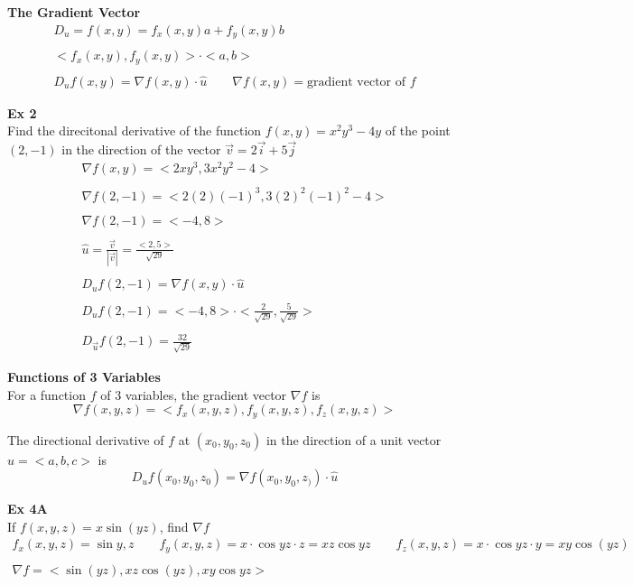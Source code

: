 \documentclass{article}
\begin{document}
    \textbf{The Gradient Vector}
    \[
        \begin{gathered}
        D_{u}=f(x,y)=f_{x}(x,y)a+f_{y}(x,y)b\\
        ~\\
        <f_{x}(x,y) ,f_{y}(x,y)> \cdot < a, b > \\
        ~\\
        D_{u}f(x,y)= \nabla f(x,y) \cdot \hat{u} \qquad \nabla f(x,y)=\text{gradient vector of }f
        \end{gathered}
    \]

    \textbf{Ex 2}\\
    Find the direcitonal derivative of the function $ f(x,y) =x^{2}y^{3}-4y  $ of the point $ (2,-1) $ in the direction of the vector $ \vec{v}=2\vec{i}+5\vec{j} $
    \[
        \begin{gathered}
        \nabla f(x,y)=< 2xy^{3}, 3x^{2}y^{2}-4>\\
        ~\\
        \nabla f(2,-1)=< 2(2)(-1)^{3} ,3(2)^{2}(-1)^{2}-4 >\\
        ~\\
        \nabla f(2,-1) = < -4, 8 >\\
        ~\\
        \hat{u}= \frac{\vec{v}}{| \vec{v} |}= \frac{< 2, 5 > }{\sqrt{29}}\\
        ~\\
        D_{u}f(2,-1)=\nabla f(x,y) \cdot \hat{u}\\
        ~\\
        D_{u}f(2,-1)= < -4, 8 > \cdot  < \frac{2}{\sqrt{29} } , \frac{5}{\sqrt{29} }  >\\
        ~\\
        \boxed{D_{\vec{u}}f(2,-1)=\frac{32}{\sqrt{29}}}     
        \end{gathered}
    \]

    \textbf{Functions of 3 Variables}\\
    For a function $ f $ of $ 3 $ variables, the gradient vector $ \nabla f $ is
    \[
        \nabla f(x,y,z)= < f_{x}(x,y,z) , f_{y}(x,y,z) , f_{z}(x,y,z) > 
    \]

    The directional derivative of $ f $ at $ (x_{0},y_{0},z_{0}) $ in the direction of a unit vector $ \hat{u} =< a, b, c > $ is
    \[
        D_{u}f(x_{0},y_{0},z_{0})= \nabla f(x_{0},y_{0},z_{)}) \cdot \hat{u} 
    \]
    
    \textbf{Ex 4A}\\
    If $ f(x,y,z) =x\sin{(yz)}$, find $ \nabla f $
    \[
        \begin{gathered}
        f_{x}(x,y,z)=\sin{y,z} \qquad f_{y}(x,y,z)=x \cdot \cos{yz} \cdot z = xz \cos{yz} \qquad f_{z}(x,y,z)= x \cdot \cos{yz} \cdot y=xy\cos{(yz)}\\
        ~\\
        \boxed{\nabla f = < \sin{(yz)}, xz\cos{(yz)}, xy\cos{yz}>} 
        \end{gathered}
    \]
    
\end{document}
